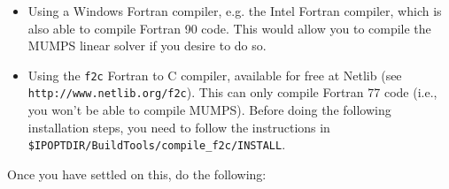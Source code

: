 \documentclass[10pt]{article}
\begin{document}
\begin{itemize}
\item Using a Windows Fortran compiler, e.g. the Intel Fortran
  compiler, which is also able to compile Fortran 90 code.  This would
  allow you to compile the MUMPS linear solver if you desire to do so.
\item Using the {\tt f2c} Fortran to C compiler, available for free at
  Netlib (see {\tt http://www.netlib.org/f2c}).  This can only compile
  Fortran 77 code (i.e., you won't be able to compile MUMPS).  Before
  doing the following installation steps, you need to follow the
  instructions in\\ {\tt\$IPOPTDIR/BuildTools/compile\_f2c/INSTALL}.
\end{itemize}

\noindent
Once you have settled on this, do the following:
\end{document}
